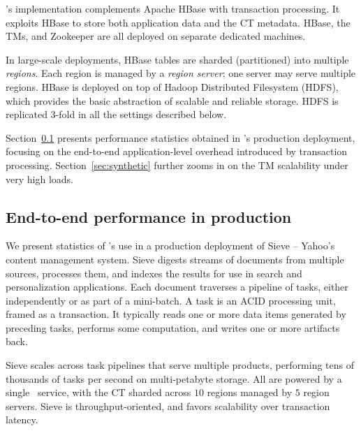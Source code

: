 
\sys's implementation complements Apache HBase with transaction processing. 
It exploits HBase to store both  application data and the CT metadata. 
HBase, the TMs, and Zookeeper are all deployed on separate dedicated machines.

In large-scale deployments, HBase tables are  sharded (partitioned) into multiple \emph{regions}.
Each region is managed by a \emph{region server}; one server may serve multiple regions. HBase 
is deployed on top of Hadoop Distributed Filesystem (HDFS), which provides the basic abstraction 
of scalable and reliable storage. HDFS is replicated 3-fold in all the settings described below. 

Section~\ref{sec:prod} presents performance statistics obtained in \sys's 
production deployment, focusing on the end-to-end application-level overhead introduced 
by transaction processing. Section~\ref{sec:synthetic} further zooms in on the TM scalability
under very high loads.

\subsection{End-to-end performance in production}
\label{sec:prod}

We present statistics of \sys's use in a production deployment of Sieve -- Yahoo's
content management system. 
Sieve digests streams of documents from multiple sources, processes them, and indexes 
the results for use in search and personalization applications. Each document 
traverses a pipeline of  tasks, either independently or as part of a mini-batch. 
A task is an  ACID processing unit, framed as a transaction. It typically reads 
one or more data items generated by  preceding tasks, performs some computation, 
and writes one or more artifacts back. 

Sieve scales across task pipelines that serve multiple products,  performing tens of thousands 
of tasks per second on multi-petabyte storage. All  
are powered by a single \sys\ service, with the CT sharded across $10$ regions
managed by $5$ region servers.  
Sieve is throughput-oriented, and favors  scalability over transaction latency. 

